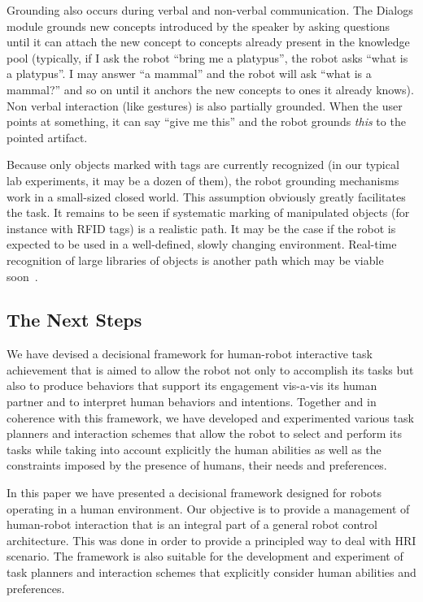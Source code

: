 \documentclass[preprint,3p,times]{elsarticle}
\begin{document}
Grounding also occurs during verbal and non-verbal communication. The {\sc
Dialogs} module grounds new concepts introduced by the speaker by asking questions
until it can attach the new concept to concepts already present in the
knowledge pool (typically, if I ask the robot ``bring me a platypus'', the
robot asks ``what is a platypus''. I may answer ``a mammal'' and the robot will
ask ``what is a mammal?'' and so on until it anchors the new concepts to ones
it already knows). Non verbal interaction (like gestures) is also partially
grounded. When the user points at something, it can say ``give me this'' and
the robot grounds \emph{this} to the pointed artifact.

Because only objects marked with tags are currently recognized (in our typical
lab experiments, it may be a dozen of them), the robot grounding mechanisms work
in a small-sized closed world. This assumption obviously greatly facilitates
the task. It remains to be seen if systematic marking of manipulated objects
(for instance with RFID tags) is a realistic path. It may be the case if the
robot is expected to be used in a well-defined, slowly changing environment.
Real-time recognition of large libraries of objects is another path which may
be viable soon~\cite{Dean2013Fast}.


\subsection{The Next Steps}


We have devised a decisional framework for human-robot interactive
task achievement that is aimed to allow the robot not only to
accomplish its tasks but also to produce behaviors that support its
engagement vis-a-vis its human partner and to interpret human
behaviors and intentions. 
Together and in coherence with this framework, we have developed
and experimented various task planners and interaction schemes that
allow the robot to select and perform its tasks while taking into
account explicitly the human abilities as well as the constraints
imposed by the presence of humans, their needs and preferences. 


In this paper we have presented a decisional framework designed for
robots operating in a human environment. Our objective is to provide a
management of human-robot interaction that is an integral part of a
general robot control architecture.  This was done in order to provide
a principled way to deal with HRI scenario.  The framework is also
suitable for the development and experiment of task planners and
interaction schemes that explicitly consider human abilities and
preferences.
\end{document}
